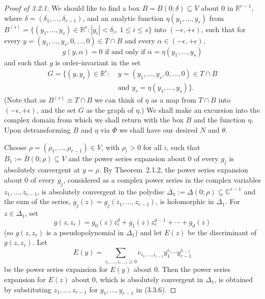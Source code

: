 \documentclass[11pt]{article}
\theoremstyle{plain}
\theoremstyle{definition}
\newcommand{\R}{\mathbb{R}}
\newcommand{\C}{\mathbb{C}}
\begin{document}
\begin{proof}[Proof of 3.2.1]
We should like to find a box $B = B(0; \delta) \subseteq V$ about $0$
in $\R^{r-1}$, where $\delta = (\delta_1, \ldots, \delta_{r-1})$, and
an analytic function $\eta(y_1, \ldots, y_s)$ from
$B^{(s)} = \{ (y_1, \ldots, y_s) \in \R^s : |y_i| < \delta_i,\
1 \le i \le s \}$ into $(-\epsilon, +\epsilon)$, such that for every
$y = (y_1, \ldots, y_s, 0, \ldots, 0) \in T \cap B$ and every
$\alpha \in (-\epsilon, +\epsilon)$,
\begin{equation}
g(y, \alpha) = 0 \text{ if and only if } \alpha = \eta(y_1, \ldots, y_s) \tag{3.3.4}
\end{equation}
and such that $g$ is order-invariant in the set
\begin{equation}
\begin{aligned}
G = \{ (y, y_r) \in \R^r :\ &y = (y_1, \ldots, y_s, 0, \ldots, 0) \in T \cap B \\
&\text{and } y_r = \eta(y_1, \ldots, y_s) \}.
\end{aligned}
\tag{3.3.5}
\end{equation}
(Note that as $B^{(s)} \equiv T \cap B$ we can think of $\eta$ as a map
from $T \cap B$ into $(-\epsilon, +\epsilon)$, and the set $G$ as the
graph of $\eta$.) We shall make an excursion into the complex domain
from which we shall return with the box $B$ and the function $\eta$.
Upon detransforming $B$ and $\eta$ via $\Phi$ we shall have our
desired $N$ and $\theta$.

Choose $\rho = (\rho_1, \ldots, \rho_{r-1}) \in V$, with $\rho_i > 0$
for all $i$, such that $B_1 := B(0; \rho) \subseteq V$ and the power
series expansion about $0$ of every $g_j$ is absolutely convergent at
$y = \rho$. By Theorem~2.1.2, the power series expansion about $0$ of
every $g_j$, considered as a complex power series in the complex
variables $z_1, \ldots, z_{r-1}$, is absolutely convergent in the
polydisc $\Delta_1 := \Delta(0; \rho) \subseteq \C^{r-1}$ and the sum
of the series, $g_j(z) = g_j(z_1, \ldots, z_{r-1})$, is holomorphic in
$\Delta_1$. For $z \in \Delta_1$, set
\[
g(z, z_r) = g_0(z) z_r^d + g_1(z) z_r^{d-1} + \cdots + g_d(z)
\]
(so $g(z, z_r)$ is a pseudopolynomial in $\Delta_1$) and let $E(z)$
be the discriminant of $g(z, z_r)$. Let
\begin{equation}
E(y) = \sum_{i_1, \ldots, i_{r-1} \ge 0}
e_{i_1, \ldots, i_{r-1}} y_1^{i_1} \cdots y_{r-1}^{i_{r-1}} \tag{3.3.6}
\end{equation}
be the power series expansion for $E(y)$ about $0$. Then the power
series expansion for $E(z)$ about $0$, which is absolutely convergent
in $\Delta_1$, is obtained by substituting $z_1, \ldots, z_{r-1}$ for
$y_1, \ldots, y_{r-1}$ in (3.3.6).


\end{proof}
\end{document}

